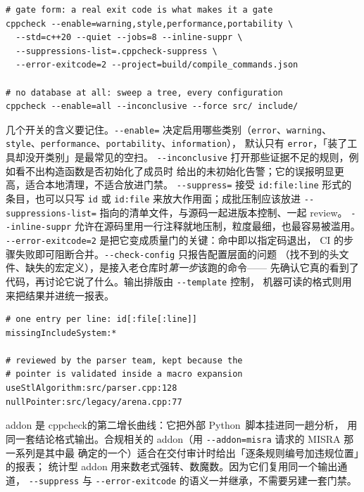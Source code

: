 \documentclass[12pt,a4paper,fontset=fandol]{ctexbook}
\newcommand{\Opt}[1]{\texttt{-\/-#1}}
\newcommand{\Bk}{\discretionary{}{}{}}
\newcommand{\Lang}[1]{\textsf{#1}}
\newcommand{\PY}{\Lang{Python}}
\begin{document}
\begin{lstlisting}[style=shellstyle,caption={\Bk cppcheck\Bk 的两种形态：门禁与裸扫},label={lst:ch15-cppcheck}]
# gate form: a real exit code is what makes it a gate
cppcheck --enable=warning,style,performance,portability \
  --std=c++20 --quiet --jobs=8 --inline-suppr \
  --suppressions-list=.cppcheck-suppress \
  --error-exitcode=2 --project=build/compile_commands.json

# no database at all: sweep a tree, every configuration
cppcheck --enable=all --inconclusive --force src/ include/
\end{lstlisting}

几个开关的含义要记住。\Opt{enable=} 决定启用哪些类别（\texttt{error}、\texttt{warning}、
\texttt{style}、\texttt{performance}、\texttt{portability}、\texttt{information}），
默认只有 \texttt{error}，「装了工具却没开类别」是最常见的空扫。
\Opt{inconclusive} 打开那些证据不足的规则，例如看不出构造函数是否初始化了成员时
给出的未初始化告警；它的误报明显更高，适合本地清理，不适合放进门禁。
\Opt{suppress=} 接受 \texttt{id:file:line} 形式的条目，也可以只写 \texttt{id}
或 \texttt{id:file} 来放大作用面；成批压制应该放进 \Opt{suppressions-list=}
指向的清单文件，与源码一起进版本控制、一起 review。
\Opt{inline-suppr} 允许在源码里用一行注释就地压制，粒度最细，也最容易被滥用。
\Opt{error-exitcode=2} 是把它变成质量门的关键：命中即以指定码退出，
CI 的步骤失败即可阻断合并。\Opt{check-config} 只报告配置层面的问题
（找不到的头文件、缺失的宏定义），是接入老仓库时\emph{第一步}该跑的命令——
先确认它真的看到了代码，再讨论它说了什么。输出排版由 \Opt{template} 控制，
机器可读的格式则用来把结果并进统一报表。

\begin{lstlisting}[style=shellstyle,caption={抑制清单：每条压制都带理由与归属},label={lst:ch15-suppress}]
# one entry per line: id[:file[:line]]
missingIncludeSystem:*

# reviewed by the parser team, kept because the
# pointer is validated inside a macro expansion
useStlAlgorithm:src/parser.cpp:128
nullPointer:src/legacy/arena.cpp:77
\end{lstlisting}

addon 是 \Bk cppcheck\Bk 的第二增长曲线：它把外部 \PY\ 脚本挂进同一趟分析，
用同一套结论格式输出。合规相关的 addon（用 \Opt{addon=misra} 请求的 MISRA 那一系列是其中最
确定的一个）适合在交付审计时给出「逐条规则编号加违规位置」的报表；
统计型 addon 用来数老式强转、数魔数。因为它们复用同一个输出通道，
\Opt{suppress} 与 \Opt{error-exitcode} 的语义一并继承，不需要另建一套门禁。
\end{document}
